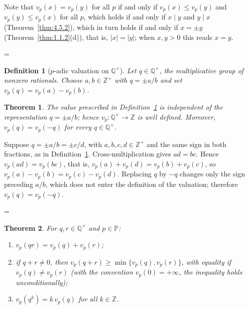 \documentclass[11pt]{article}
\makeatletter
\theoremstyle{ntstyle}
\newtheorem{theorem}{Theorem}[subsection]
\newtheorem{definition}{Definition}[subsection]
\let\nt@closedisplay\]
\def\nt@guardedclose{\@ifnextchar\par{\nt@closeafterpar}{\@ifnextchar\end{\postdisplaypenalty\@M\nt@closedisplay}{\nt@closedisplay}}}
\def\nt@closeafterpar\par{\@ifnextchar\par{\nt@closeafterpar}{\@ifnextchar\end{\postdisplaypenalty\@M\nt@closedisplay\par}{\nt@closedisplay\par}}}
\renewenvironment{proof}[1][\proofname]{\par
  \pushQED{\qed}\normalfont\topsep\medskipamount\edef\nt@afterproof{\@endparpenalty=\the\@endparpenalty\relax}\@beginparpenalty\@M\@endparpenalty\@M\let\]\nt@guardedclose\trivlist\item[]\textit{#1\@addpunct{.}} \ignorespaces}{\ifvmode\addpenalty\@M\fi\popQED\nt@afterproof\endtrivlist\@endpefalse}
\newcommand{\Primes}{\mathbb{P}}
\makeatother
\begin{document}
\begin{proof} Note that $v_p(x) = v_p(y)$ for all $p$ if and only if $v_p(x) \le v_p(y)$ and $v_p(y) \le v_p(x)$ for all $p$, which holds if and only if $x \mid y$ and $y \mid x$ (Theorem~\ref{thm:4.5.2}), which in turn holds if and only if $x = \pm y$ (Theorem~\ref{thm:1.1.2}(d)), that is, $|x| = |y|$; when $x, y > 0$ this reads $x = y$.

\end{proof}
\begin{definition}[$p$-adic valuation on $\mathbb{Q}^{\times}$]\label{def:4.5.2} Let $q \in \mathbb{Q}^{\times}$, the multiplicative group
	of nonzero rationals. Choose
	$a,b\in\mathbb{Z}^+$ with $q=\pm a/b$ and set
	$v_p(q)=v_p(a)-v_p(b)$.

\end{definition}
\begin{theorem}\label{thm:4.5.4} The value prescribed in Definition~\ref{def:4.5.2} is
	independent of the representation $q=\pm a/b$; hence
	$v_p:\mathbb{Q}^{\times}\to\mathbb{Z}$ is well defined. Moreover,
	$v_p(q)=v_p(-q)$ for every $q\in\mathbb{Q}^{\times}$.

\end{theorem}

\begin{proof} Suppose $q=\pm a/b=\pm c/d$, with
	$a,b,c,d \in \mathbb{Z}^+$ and the same sign in both fractions, as in
	Definition~\ref{def:4.5.2}. Cross-multiplication gives $ad = bc$. Hence $v_p(ad) =
		v_p(bc)$, that is, $v_p(a) + v_p(d) = v_p(b) + v_p(c)$, so
	$v_p(a) - v_p(b) = v_p(c) - v_p(d)$. Replacing $q$ by $-q$ changes only
	the sign preceding $a/b$, which does not enter
	the definition of the valuation; therefore $v_p(q)=v_p(-q)$.

\end{proof}
\begin{theorem}\label{thm:4.5.5} For $q, r \in \mathbb{Q}^{\times}$ and
	$p \in \Primes$:

	\begin{enumerate}[label={\alph*)}]
		\item $v_p(qr) = v_p(q) + v_p(r)$;
		\item if $q + r \neq 0$, then $v_p(q + r) \ge \min\{v_p(q), v_p(r)\}$, with equality if
		      $v_p(q) \neq v_p(r)$ (with the convention $v_p(0) = +\infty$, the inequality holds unconditionally);
		\item $v_p(q^{k}) = k\, v_p(q)$ for all $k \in \mathbb{Z}$.
	\end{enumerate}

\end{theorem}
\end{document}
